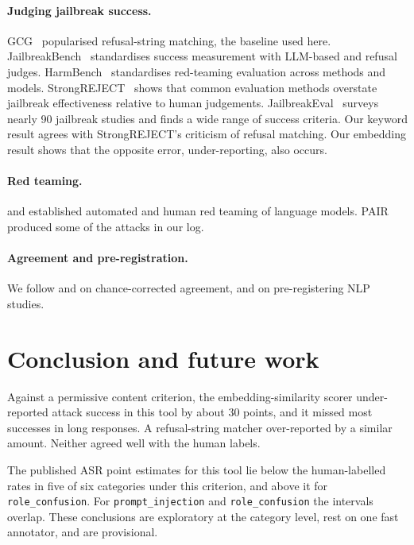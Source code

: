 \documentclass[11pt]{article}
\newcommand{\code}[1]{\texttt{#1}}
\begin{document}
\paragraph{Judging jailbreak success.} GCG~\citep{zou2023universal} popularised refusal-string matching, the baseline used here. JailbreakBench~\citep{chao2024jailbreakbench} standardises success measurement with LLM-based and refusal judges. HarmBench~\citep{mazeika2024harmbench} standardises red-teaming evaluation across methods and models. StrongREJECT~\citep{souly2024strongreject} shows that common evaluation methods overstate jailbreak effectiveness relative to human judgements. JailbreakEval~\citep{ran2024jailbreakeval} surveys nearly 90 jailbreak studies and finds a wide range of success criteria. Our keyword result agrees with StrongREJECT's criticism of refusal matching. Our embedding result shows that the opposite error, under-reporting, also occurs.

\paragraph{Red teaming.} \citet{perez2022red} and \citet{ganguli2022red} established automated and human red teaming of language models. PAIR~\citep{chao2023jailbreaking} produced some of the attacks in our log.

\paragraph{Agreement and pre-registration.} We follow \citet{cohen1960coefficient} and \citet{artstein2008inter} on chance-corrected agreement, and \citet{vanmiltenburg2021preregistering} on pre-registering NLP studies.

\section{Conclusion and future work}

Against a permissive content criterion, the embedding-similarity scorer under-reported attack success in this tool by about 30 points, and it missed most successes in long responses. A refusal-string matcher over-reported by a similar amount. Neither agreed well with the human labels.

The published ASR point estimates for this tool lie below the human-labelled rates in five of six categories under this criterion, and above it for \code{role\_confusion}. For \code{prompt\_injection} and \code{role\_confusion} the intervals overlap. These conclusions are exploratory at the category level, rest on one fast annotator, and are provisional.
\end{document}
